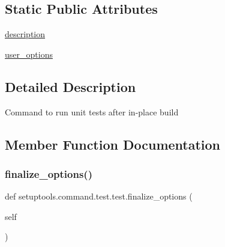 \subsection*{Static Public Attributes}
\begin{DoxyCompactItemize}
\item 
\hyperlink{classsetuptools_1_1command_1_1test_1_1test_a60ea1fc63bca31dc147dd1d2fc5183ba}{description}
\item 
\hyperlink{classsetuptools_1_1command_1_1test_1_1test_ab0387d4eed8df56f938f0c399aaf2a9a}{user\+\_\+options}
\end{DoxyCompactItemize}


\subsection{Detailed Description}
\begin{DoxyVerb}Command to run unit tests after in-place build\end{DoxyVerb}
 

\subsection{Member Function Documentation}
\mbox{\label{classsetuptools_1_1command_1_1test_1_1test_a11a76cb9682d8a442ca50e1a3729131f}} 
\subsubsection{\texorpdfstring{finalize\+\_\+options()}{finalize\_options()}}
{\footnotesize\ttfamily def setuptools.\+command.\+test.\+test.\+finalize\+\_\+options (\begin{DoxyParamCaption}\item[{}]{self }\end{DoxyParamCaption})}

\mbox{\label{classsetuptools_1_1command_1_1test_1_1test_a337f4e04623d21e3cf482973c4c3a5ea}} 
